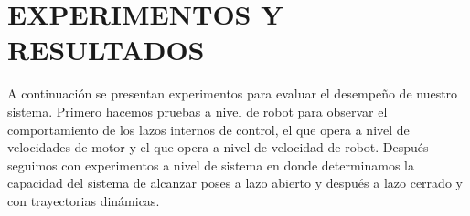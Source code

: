 \documentclass[twocolumn,10pt]{amrob}
\newcommand{\NOTE}[1]{{\color{blue}{Note: {#1}}}}
\begin{document}
\section*{EXPERIMENTOS Y RESULTADOS}
\label{sec:experimentacion_resultados}
A continuación se presentan experimentos para evaluar el desempeño de nuestro sistema. Primero hacemos pruebas a nivel de robot para observar  el comportamiento de los lazos internos de control, el que opera a nivel de velocidades de motor y el que opera a nivel de velocidad de robot. Después seguimos con experimentos a nivel de sistema en donde determinamos la capacidad del sistema de alcanzar poses a lazo abierto y después a lazo cerrado y con trayectorias dinámicas.
\end{document}
